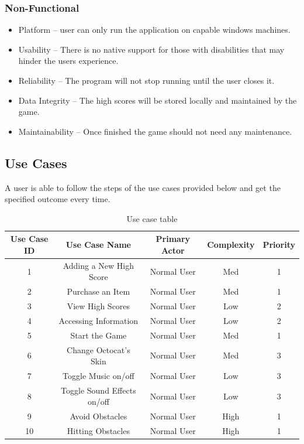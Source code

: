 \documentclass[10pt,conference,onecolumn,compsoc]{IEEEtran}
\begin{document}
\subsubsection{Non-Functional}
\begin{itemize}
\item Platform -- user can only run the application on capable windows machines.
\item Usability -- There is no native support for those with disabilities that may hinder the users experience.
\item Reliability -- The program will not stop running until the user closes it.
\item Data Integrity -- The high scores will be stored locally and maintained by the game.
\item Maintainability -- Once finished the game should not need any maintenance.
\end{itemize}

\subsection{Use Cases}

A user is able to follow the steps of the use cases provided below and get the specified outcome every time.

\begin{table}[hp]
\centering
\begin{tabular}{|c|c|c|c|c|}
\hline
Use Case ID & Use Case Name & Primary Actor & Complexity & Priority \\
\hline \hline
1 & Adding a New High Score & Normal User & Med & 1\\
\hline
2 & Purchase an Item & Normal User & Med & 1\\
\hline
3 & View High Scores & Normal User & Low & 2\\
\hline
4 & Accessing Information & Normal User & Low & 2\\
\hline
5 & Start the Game & Normal User & Med & 1\\
\hline
6 & Change Octocat's Skin & Normal User & Med & 3\\
\hline
7 & Toggle Music on/off & Normal User & Low & 3\\
\hline
8 & Toggle Sound Effects on/off& Normal User & Low & 3\\
\hline
9 & Avoid Obstacles & Normal User & High & 1\\
\hline
10 & Hitting Obstacles & Normal User & High & 1\\
\hline

\end{tabular}
\caption{Use case table}
\label{tab:useCaseIndex}
\end{table}
\end{document}
